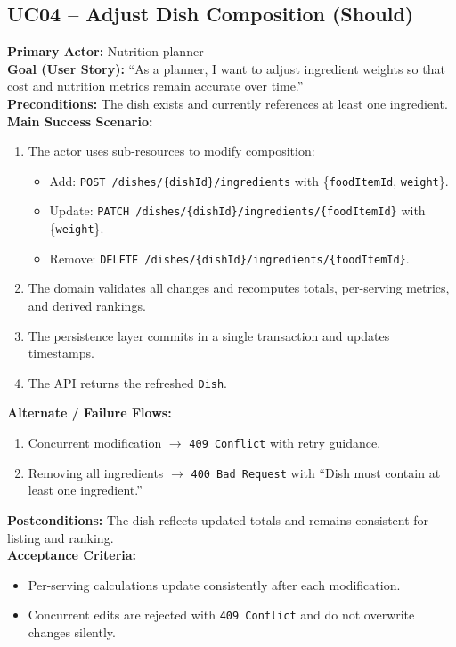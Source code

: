 \documentclass[11pt]{article}
\begin{document}
\subsection*{UC04 -- Adjust Dish Composition (Should)}
\textbf{Primary Actor:} Nutrition planner\\
\textbf{Goal (User Story):} ``As a planner, I want to adjust ingredient weights so that cost and nutrition metrics remain accurate over time.''\\
\textbf{Preconditions:} The dish exists and currently references at least one ingredient.\\
\textbf{Main Success Scenario:}
\begin{enumerate}[label=\arabic*.]
  \item The actor uses sub-resources to modify composition:
    \begin{itemize}[noitemsep]
      \item Add: \texttt{POST /dishes/\{dishId\}/ingredients} with \{\texttt{foodItemId}, \texttt{weight}\}.
      \item Update: \texttt{PATCH /dishes/\{dishId\}/ingredients/\{foodItemId\}} with \{\texttt{weight}\}.
      \item Remove: \texttt{DELETE /dishes/\{dishId\}/ingredients/\{foodItemId\}}.
    \end{itemize}
  \item The domain validates all changes and recomputes totals, per-serving metrics, and derived rankings.
  \item The persistence layer commits in a single transaction and updates timestamps.
  \item The API returns the refreshed \texttt{Dish}.
\end{enumerate}
\textbf{Alternate / Failure Flows:}
\begin{enumerate}[label=\arabic*F.]
  \item Concurrent modification $\rightarrow$ \texttt{409 Conflict} with retry guidance.
  \item Removing all ingredients $\rightarrow$ \texttt{400 Bad Request} with ``Dish must contain at least one ingredient.''
\end{enumerate}
\textbf{Postconditions:} The dish reflects updated totals and remains consistent for listing and ranking.\\
\textbf{Acceptance Criteria:}
\begin{itemize}[noitemsep]
  \item Per-serving calculations update consistently after each modification.
  \item Concurrent edits are rejected with \texttt{409 Conflict} and do not overwrite changes silently.
\end{itemize}
\end{document}
